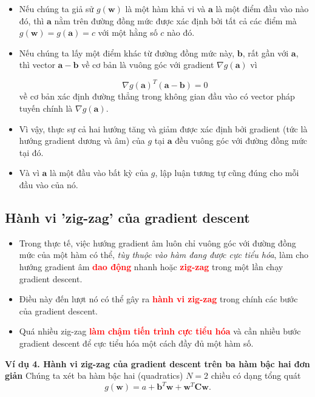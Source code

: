 \documentclass{book}
\begin{document}
\begin{itemize}
    \item Nếu chúng ta giả sử $g\left(\mathbf{w}\right)$ là một hàm khả vi và $\mathbf{a}$ là một điểm đầu vào nào đó, thì $\mathbf{a}$ nằm trên đường đồng mức được xác định bởi tất cả các điểm mà $g\left(\mathbf{w}\right) = g\left(\mathbf{a}\right) = c$ với một hằng số $c$ nào đó.
    \item Nếu chúng ta lấy một điểm khác từ đường đồng mức này, $\mathbf{b}$, rất gần với $\mathbf{a}$, thì vector $\mathbf{a} - \mathbf{b}$ về cơ bản là vuông góc với gradient $\nabla g\left(\mathbf{a}\right)$ vì 

    \begin{equation*}
        \nabla g\left(\mathbf{a}\right)^T\left(\mathbf{a} - \mathbf{b}\right) = 0
    \end{equation*}
    về cơ bản xác định đường thẳng trong không gian đầu vào có vector pháp tuyến chính là $\nabla g\left(\mathbf{a}\right)$.
    \item Vì vậy, thực sự cả hai hướng tăng và giảm được xác định bởi gradient (tức là hướng gradient dương và âm) của $g$ tại $\mathbf{a}$ đều vuông góc với đường đồng mức tại đó.
    \item Và vì $\mathbf{a}$ là một đầu vào bất kỳ của $g$, lập luận tương tự cũng đúng cho mỗi đầu vào của nó.
\end{itemize}
\subsection{Hành vi 'zig-zag' của gradient descent}
\begin{itemize}
    \item Trong thực tế, việc hướng gradient âm luôn chỉ vuông góc với đường đồng mức của một hàm có thể, \textit{tùy thuộc vào hàm đang được cực tiểu hóa}, làm cho hướng gradient âm \textbf{\textcolor{red}{dao động}} nhanh hoặc \textbf{\textcolor{red}{zig-zag}} trong một lần chạy gradient descent.
    \item Điều này đến lượt nó có thể gây ra \textbf{\textcolor{red}{hành vi zig-zag}} trong chính các bước của gradient descent.
    \item Quá nhiều zig-zag \textbf{\textcolor{red}{làm chậm tiến trình cực tiểu hóa}} và cần nhiều bước gradient descent để cực tiểu hóa một cách đầy đủ một hàm số.
\end{itemize}
\textbf{Ví dụ 4. Hành vi zig-zag của gradient descent trên ba hàm bậc hai đơn giản}
Chúng ta xét ba hàm bậc hai (quadratics) $N = 2$ chiều có dạng tổng quát
\begin{equation}
g(\mathbf{w}) = a + \mathbf{b}^T\mathbf{w} + \mathbf{w}^T\mathbf{C}\mathbf{w}.
\end{equation}
\end{document}
